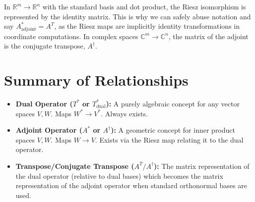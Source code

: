 \begin{notechapter}
\begin{remark}
In $\mathbb{R}^m \to \mathbb{R}^n$ with the standard basis and 
dot product, the Riesz isomorphism is represented by the identity 
matrix. This is why we can safely abuse notation and say 
$A^*_{\text{adjoint}} = A^T$, as the Riesz maps are implicitly 
identity transformations in coordinate computations. 
In complex spaces $\mathbb{C}^m \to \mathbb{C}^n$, 
the matrix of the adjoint is the conjugate transpose, $A^\dagger$.
\end{remark}

\section{Summary of Relationships}

\begin{itemize}[leftmargin=*]
    \item \textbf{Dual Operator ($T^*$ or $T^*_{\text{dual}}$):} A purely algebraic
    concept for any vector spaces $V, W$. Maps $W^* \to V^*$.
    Always exists.
    \item \textbf{Adjoint Operator ($A^*$ or $A^\dagger$):} A geometric
    concept for inner product spaces $V, W$. Maps $W \to V$.
    Exists via the Riesz map relating it to the dual operator.
    \item \textbf{Transpose/Conjugate Transpose ($A^T/A^\dagger$):} 
    The matrix representation of the dual operator (relative to 
    dual bases) which becomes the matrix representation of the 
    adjoint operator when standard orthonormal bases are used.
\end{itemize}
\end{notechapter}
